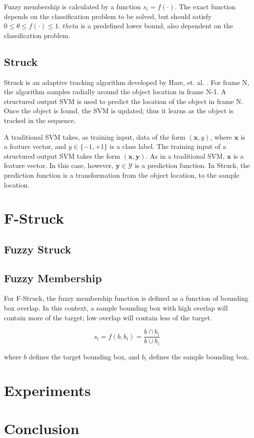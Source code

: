 \documentclass{IEEEtran}
\begin{document}
Fuzzy membership is calculated by a function \(s_i = f(\cdot)\). The exact function depends on the
classification problem to be solved, but should satisfy \(0 \le \theta \le f(\cdot) \le 1\).
\(theta\) is a predefined lower bound, also dependent on the classification problem.

\subsection{Struck} %
Struck is an adaptive tracking algorithm developed by Hare, et. al. \cite{6126251}. For frame N, the
algorithm samples radially around the object location in frame N-1. A structured output SVM is used
to predict the location of the object in frame N. Once the object is found, the SVM is updated; thus
it learns as the object is tracked in the sequence.

A traditional SVM takes, as training input, data of the form \((\textbf{x}, y)\), where
\(\textbf{x}\) is a feature vector, and \(y \in \{-1, +1\}\) is a class label. The training input of
a structured output SVM takes the form \((\textbf{x}, \textbf{y})\). As in a traditional SVM,
\(\textbf{x}\) is a feature vector. In this case, however, \(\textbf{y} \in \mathcal{Y}\) is a prediction
function. In Struck, the prediction function is a transformation from the object location, to the
sample location.

\section{F-Struck}

\subsection{Fuzzy Struck}

\subsection{Fuzzy Membership}
For F-Struck, the fuzzy membership function is defined as a function of bounding box overlap. In
this context, a sample bounding box with high overlap will contain more of the target; low overlap
will contain less of the target.

\begin{displaymath}
    s_i = f\left(b, b_i\right) = \frac{b \cap b_i}{b \cup b_i}
\end{displaymath}

where \(b\) defines the target bounding box, and \(b_i\) defines the sample bounding box.

\section{Experiments}

\section{Conclusion}



\end{document}
